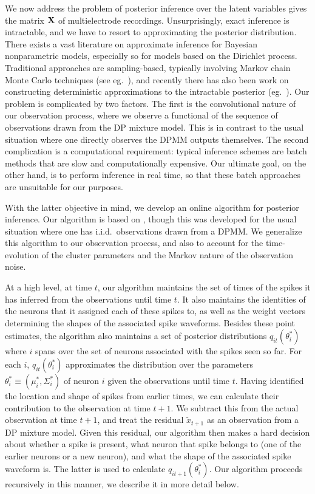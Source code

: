 \newcommand{\tx}{\tilde{x}}

We now address the problem of posterior inference over the latent variables gives the matrix $\mathbf{X}$ of multielectrode recordings. Unsurprisingly, exact 
inference is intractable, and we have to resort to approximating the posterior distribution.
There exists a vast literature on approximate inference for Bayesian nonparametric models, especially so for models based on the Dirichlet process.
Traditional approaches are sampling-based, typically involving Markov chain Monte Carlo techniques (see eg.\ \citep{Nea2000, IshJam2001}), 
and recently there has also been work on constructing deterministic approximations to the intractable posterior (eg.\ \citep{BleJor2006, MinGha2003}).
Our problem is complicated by two factors. The first is the convolutional nature of our observation process, where we observe a functional of the 
sequence of observations drawn from the DP mixture model. This is in contrast to the usual situation where one directly observes the DPMM outputs themselves.
The second complication is a computational requirement: typical inference schemes are batch methods that are slow and computationally expensive. 
Our ultimate goal, on the other hand, is to perform inference in real time, so that these batch approaches are unsuitable for our purposes.

With the latter objective in mind, we develop an online algorithm for posterior inference. Our algorithm is based on \cite{WangDun2009}, though this was 
developed for the usual situation where one has i.i.d.\ observations drawn from a DPMM. We generalize this algorithm to our observation process, and also 
to account for the time-evolution of the cluster parameters and the Markov nature of the observation noise.

At a high level, at time $t$, our algorithm maintains the set of times of the spikes it has inferred from the observations until time $t$. It also maintains
the identities of the neurons that it assigned each of these spikes to, as well as the weight vectors determining the shapes of the associated spike 
waveforms. Besides these point estimates, the algorithm also maintains a set of posterior distributions $q_{it}(\theta^*_i)$ where $i$ spans over the
set of neurons associated with the spikes seen so far. For each $i$, $q_{it}(\theta^*_i)$ approximates the distribution over the parameters 
$\theta_i^* \equiv (\mu_i^*, \Sigma_i^*)$ of neuron $i$ given the observations until time $t$. 
Having identified the location and shape of spikes from earlier times, we can calculate their contribution to the observation at time $t+1$.
We subtract this from the actual observation at time $t+1$, and treat the residual $\tx_{t+1}$ as an observation from a DP mixture model.
Given this residual, our algorithm then makes a hard decision about whether a spike is present, what neuron that spike belongs to 
(one of the earlier neurons or a new neuron), and what the shape of the associated spike waveform is. The latter is used to calculate
$q_{it+1}(\theta^*_i)$. Our algorithm proceeds recursively in this manner, we describe it in more detail below.


